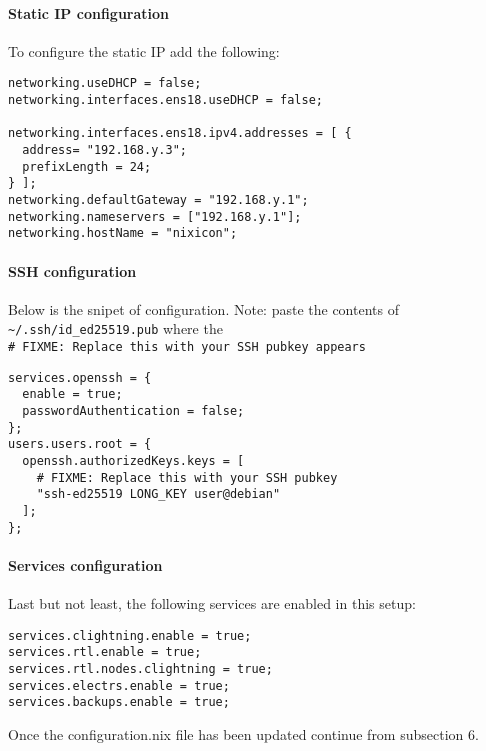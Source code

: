 \hypertarget{static-ip-configuration}{%
\paragraph{Static IP configuration}\label{static-ip-configuration}}

To configure the static IP add the following:

\begin{verbatim}
networking.useDHCP = false;
networking.interfaces.ens18.useDHCP = false;

networking.interfaces.ens18.ipv4.addresses = [ {
  address= "192.168.y.3";
  prefixLength = 24;
} ];
networking.defaultGateway = "192.168.y.1";
networking.nameservers = ["192.168.y.1"];
networking.hostName = "nixicon";
\end{verbatim}

\hypertarget{ssh-configuration}{%
\paragraph{SSH configuration}\label{ssh-configuration}}

Below is the snipet of configuration. Note: paste the contents of
\texttt{\textasciitilde{}/.ssh/id\_ed25519.pub} where the
\texttt{\#\ FIXME:\ Replace\ this\ with\ your\ SSH\ pubkey\ appears}

\begin{verbatim}
services.openssh = {
  enable = true;
  passwordAuthentication = false;
};
users.users.root = {
  openssh.authorizedKeys.keys = [
    # FIXME: Replace this with your SSH pubkey
    "ssh-ed25519 LONG_KEY user@debian"
  ];
};
\end{verbatim}

\hypertarget{services-configuration}{%
\paragraph{Services configuration}\label{services-configuration}}

Last but not least, the following services are enabled in this setup:

\begin{verbatim}
services.clightning.enable = true;
services.rtl.enable = true;
services.rtl.nodes.clightning = true;
services.electrs.enable = true;
services.backups.enable = true;
\end{verbatim}

Once the configuration.nix file has been updated continue from
subsection 6.
